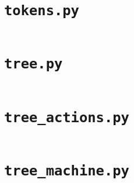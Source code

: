 \cprotect\section{\verb|tokens.py|}\label{code:token}

\inputminted{python}{/Users/valerie/Documents/Sixth-Form/Computer-Science/nea-full-repo/lilac-implementation/lilac/tokens.py}

\cprotect\section{\verb|tree.py|}\label{code:tree}

\inputminted{python}{/Users/valerie/Documents/Sixth-Form/Computer-Science/nea-full-repo/lilac-implementation/lilac/tree.py}

\cprotect\section{\verb|tree_actions.py|}\label{code:tree_actions}

\inputminted{python}{/Users/valerie/Documents/Sixth-Form/Computer-Science/nea-full-repo/lilac-implementation/lilac/tree_actions.py}

\cprotect\section{\verb|tree_machine.py|}\label{code:tree_machine}

\inputminted{python}{/Users/valerie/Documents/Sixth-Form/Computer-Science/nea-full-repo/lilac-implementation/lilac/tree_machine.py}
